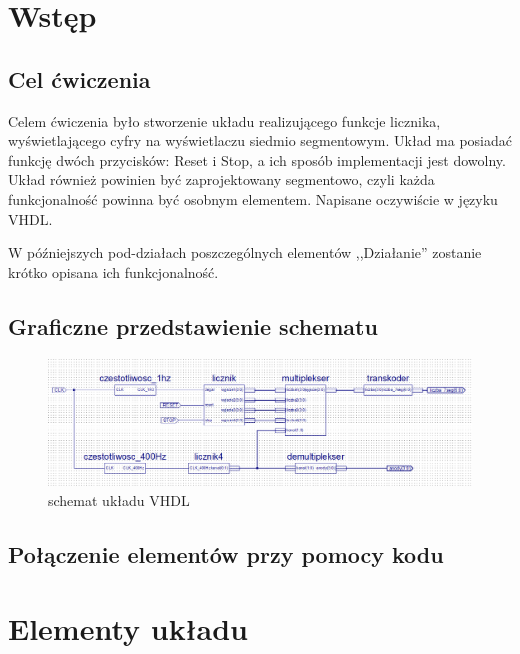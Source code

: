 \tableofcontents\clearpage

\section{Wstęp}
\subsection{Cel ćwiczenia}
\hspace*{0.5cm}Celem ćwiczenia było stworzenie układu realizującego funkcje licznika, wyświetlającego cyfry na wyświetlaczu siedmio segmentowym. Układ ma posiadać funkcję dwóch przycisków: Reset i Stop, a ich sposób implementacji jest dowolny. \\ \hspace*{0.5cm}Układ również powinien być zaprojektowany segmentowo, czyli każda funkcjonalność powinna być osobnym elementem. Napisane oczywiście w języku VHDL.

\vspace*{0.5cm}

\hspace*{0.5cm}W późniejszych pod-działach poszczególnych elementów ,,Działanie'' zostanie krótko opisana ich funkcjonalność. 

\subsection{Graficzne przedstawienie schematu}
\begin{figure}[!htb]
    \centering
    \includegraphics[width=18.4cm]{./Kod/schemat.png}
    \caption*{schemat układu VHDL}
\end{figure}

\subsection{Połączenie elementów przy pomocy kodu}


\section{Elementy układu}
